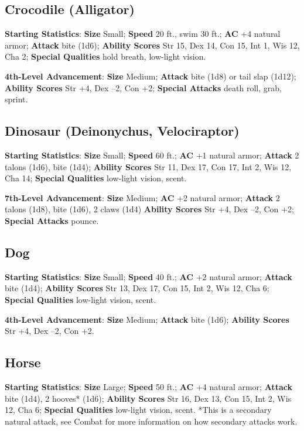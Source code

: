 \subsection{Crocodile (Alligator)}

				
\textbf{Starting Statistics}:\textbf{ Size} Small; \textbf{Speed} 20 ft., swim 30 ft.; \textbf{AC} +4 natural armor; \textbf{Attack} bite (1d6); \textbf{Ability Scores }Str 15, Dex 14, Con 15, Int 1, Wis 12, Cha 2; \textbf{Special Qualities} hold breath, low-light vision.
				
\textbf{4th-Level Advancement}: \textbf{Size }Medium; \textbf{Attack} bite (1d8) or tail slap (1d12); \textbf{Ability Scores }Str +4, Dex --2, Con +2; \textbf{Special Attacks }death roll, grab, sprint. 
				
\subsection{Dinosaur (Deinonychus, Velociraptor)}

				
\textbf{Starting Statistics}:\textbf{ Size} Small; \textbf{Speed} 60 ft.; \textbf{AC} +1 natural armor; \textbf{Attack} 2 talons (1d6), bite (1d4); \textbf{Ability Scores }Str 11, Dex 17, Con 17, Int 2, Wis 12, Cha 14; \textbf{Special Qualities} low-light vision, scent.
				
\textbf{7th-Level Advancement}: \textbf{Size }Medium; \textbf{AC }+2 natural armor; \textbf{Attack} 2 talons (1d8), bite (1d6), 2 claws (1d4) \textbf{Ability Scores }Str +4, Dex --2, Con +2; \textbf{Special Attacks} pounce. 
				
\subsection{Dog}

				
\textbf{Starting Statistics}:\textbf{ Size} Small; \textbf{Speed} 40 ft.; \textbf{AC} +2 natural armor; \textbf{Attack} bite (1d4); \textbf{Ability Scores }Str 13, Dex 17, Con 15, Int 2, Wis 12, Cha 6; \textbf{Special Qualities} low-light vision, scent.
				
\textbf{4th-Level Advancement}: \textbf{Size }Medium; \textbf{Attack} bite (1d6); \textbf{Ability Scores }Str +4, Dex --2, Con +2. 
				
\subsection{Horse}

				
\textbf{Starting Statistics}:\textbf{ Size} Large; \textbf{Speed} 50 ft.; \textbf{AC} +4 natural armor; \textbf{Attack} bite (1d4), 2 hooves* (1d6); \textbf{Ability Scores }Str 16, Dex 13, Con 15, Int 2, Wis 12, Cha 6; \textbf{Special Qualities} low-light vision, scent. *This is a secondary natural attack, see Combat for more information on how secondary attacks work.
				
